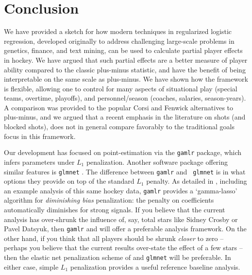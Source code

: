 \section{Conclusion}\label{sec:conclusion}

We have provided a sketch for how modern techniques in regularized logistic
regression, developed originally to address challenging large-scale problems
in genetics, finance, and text mining, can be used to calculate partial player
effects in hockey.  We have argued that such  partial effects are a
better measure of player ability compared to the classic plus-minus statistic,
and have the benefit of being interpretable on the same scale as plus-minus.
 We have shown
how the framework is flexible, allowing one to control for many aspects of
situational play (special teams, overtime, playoffs), and personnel/season
(coaches, salaries, season-years).  A comparison was provided to the popular
Corsi and Fenwick alternatives to plus-minus, and we argued that a recent
emphasis in the literature on shots (and blocked shots), does not in general
compare favorably to the traditional goals focus in this framework.

Our development has focused on point-estimation via the {\tt gamlr} package,
which infers parameters under $L_1$ penalization.  Another software package
offering similar features is {\tt glmnet}
\cite{zou_regularization_2005}.  The difference between {\tt gamlr} and {\tt
glmnet} is in what options they provide on top of the standard $L_1$ penalty.
As detailed in \cite{taddy_one-step_2015}, including an example analysis of
this same hockey data, {\tt gamlr} provides a `gamma-lasso' algorithm for
\textit{diminishing bias} penalization: the penalty on coefficients
automatically diminishes for strong signals.  If you believe that the current
analysis has over-shrunk the influence of, say, total stars like Sidney Crosby
or Pavel Datsyuk, then {\tt gamlr} and \cite{taddy_one-step_2015} will offer a
preferable analysis framework.  On the other hand, if you think that all
players should be shrunk \textit{closer} to zero -- perhaps you believe that
the current results over-state the effect of a few stars -- then the elastic
net penalization scheme of \cite{zou_regularization_2005} and {\tt glmnet}
will be preferable.  In either case, simple $L_1$ penalization provides a
useful reference baseline analysis.

